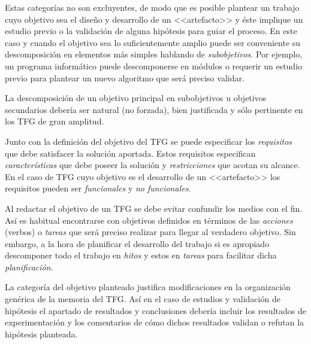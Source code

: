 Estas categorías no son excluyentes, de modo que es posible plantear un trabajo cuyo objetivo sea el diseño y desarrollo de un <<artefacto>> y éste implique un estudio previo o la validación de alguna hipótesis para guiar el proceso. En este caso y cuando el objetivo sea lo suficientemente amplio puede ser conveniente su descomposición en elementos más simples hablando de \emph{subobjetivos}. Por ejemplo, un programa informático puede descomponerse en módulos o requerir un estudio previo para plantear un nuevo algoritmo que será preciso validar.

La descomposición de un objetivo principal en subobjetivos u objetivos secundarios debería ser natural (no forzada), bien justificada y sólo pertinente en los TFG de gran amplitud.

Junto con la definición del objetivo del TFG se puede especificar los \emph{requisitos} que debe satisfacer la solución aportada. Estos requisitos especifican \emph{características} que debe poseer la solución y \emph{restricciones} que acotan su alcance. En el caso de TFG cuyo objetivo es el desarrollo de un <<artefacto>> los requisitos pueden ser \emph{funcionales} y \emph{no funcionales}.

Al redactar el objetivo de un TFG se debe evitar confundir los medios con el fin. Así es habitual encontrarse con objetivos definidos en términos de las \emph{acciones} (verbos) o \emph{tareas} que será preciso realizar para llegar al verdadero objetivo. Sin embargo, a la hora de planificar el desarrollo del trabajo si es apropiado descomponer todo el trabajo en \emph{hitos} y estos en \emph{tareas} para facilitar dicha \emph{planificación}.


La categoría del objetivo planteado justifica modificaciones en la organización genérica de la memoria del TFG. Así en el caso de estudios y validación de hipótesis el apartado de resultados y conclusiones debería incluir los resultados de experimentación y los comentarios de cómo dichos resultados validan o refutan la hipótesis planteada.
